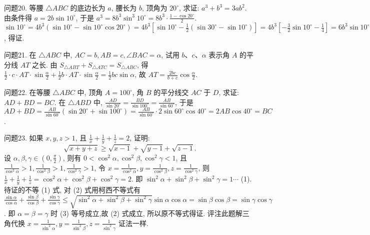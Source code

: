 问题20. 等腰 $\triangle A B C$ 的底边长为 $a$, 腰长为 $b$, 顶角为 $20^{\circ}$, 求证: $a^3+b^3=3 a b^2$.
由条件得 $a=2 b \sin 10^{\circ}$, 于是 $a^3=8 b^3 \sin ^3 10^{\circ}=8 b^3 \cdot \frac{1-\cos 20^{\circ}}{2}$. $\sin 10^{\circ}=4 b^3\left(\sin 10^{\circ}-\sin 10^{\circ} \cos 20^{\circ}\right)=4 b^3\left[\sin 10^{\circ}-\frac{1}{2}\left(\sin 30^{\circ}-\sin 10^{\circ}\right)\right]= 4 b^3\left[-\frac{3}{2} \sin 10^{\circ}-\frac{1}{4}\right]=6 b^3 \sin 10^{\circ}-b^3=3 a b^2-b^3$, 得证.



问题21. 在 $\triangle A B C$ 中, $A C=b, A B=c, \angle B A C=\alpha$, 试用 $b 、 c 、 \alpha$ 表示角 $A$ 的平分线 $A T$ 之长.
由 $S_{\triangle A B T}+S_{\triangle A T C}=S_{\triangle A B C}$, 得 $\frac{1}{2} \cdot c \cdot A T \cdot \sin \frac{\alpha}{2}+\frac{1}{2} b \cdot A T \cdot \sin \frac{\alpha}{2}= \frac{1}{2} b c \sin \alpha$, 故 $A T=\frac{2 b c}{b+c} \cos \frac{\alpha}{2}$.



问题22. 在等腰 $\triangle A B C$ 中, 顶角 $A=100^{\circ}$, 角 $B$ 的平分线交 $A C$ 于 $D$, 求证: $A D+ B D=B C$.
在 $\triangle A B D$ 中, $\frac{A D}{\sin 20^{\circ}}=\frac{B D}{\sin 100^{\circ}}=\frac{A B}{\sin 60^{\circ}}$, 于是 $A D+B D= \frac{A B}{\sin 60^{\circ}}\left(\sin 20^{\circ}+\sin 100^{\circ}\right)=\frac{A B}{\sin 60^{\circ}} \cdot 2 \sin 60^{\circ} \cos 40^{\circ}=2 A B \cos 40^{\circ}=B C$.



问题23. 如果 $x, y, z>1$, 且 $\frac{1}{x}+\frac{1}{y}+\frac{1}{z}=2$, 证明:
$$
\sqrt{x+y+z} \geqslant \sqrt{x-1}+\sqrt{y-1}+\sqrt{z-1} .
$$
设 $\alpha, \beta, \gamma \in\left(0, \frac{\pi}{2}\right)$, 则有 $0<\cos ^2 \alpha, \cos ^2 \beta, \cos ^2 \gamma<1$, 且 $\frac{1}{\cos ^2 \alpha}>1, \frac{1}{\cos ^2 \beta}>1, \frac{1}{\cos ^2 \gamma}>1$, 令 $x=\frac{1}{\cos ^2 \alpha}, y=\frac{1}{\cos ^2 \beta}, z=\frac{1}{\cos ^2 \gamma}$, 则 $\frac{1}{x}+\frac{1}{y}+ \frac{1}{z}=\cos ^2 \alpha+\cos ^2 \beta+\cos ^2 \gamma=2$. 即 $\sin ^2 \alpha+\sin ^2 \beta+\sin ^2 \gamma=1 \cdots$ (1). 待证的不等
(1) 式, 对 (2) 式用柯西不等式有 $\frac{\sin \alpha}{\cos \alpha}+\frac{\sin \beta}{\cos \beta}+\frac{\sin \gamma}{\cos \gamma} \leqslant \sqrt{\sin ^2 \alpha+\sin ^2 \beta+\sin ^2 \gamma} \sin \alpha \cos \alpha=\sin \beta \cos \beta=\sin \gamma \cos \gamma$. 即 $\alpha=\beta=\gamma$ 时 (3) 等号成立,故 (2) 式成立, 所以原不等式得证.
评注此题解三角代换 $x=\frac{1}{\sin ^2 \alpha}, y=\frac{1}{\sin ^2 \beta}, z=\frac{1}{\sin ^2 \gamma}$ 证法一样.



